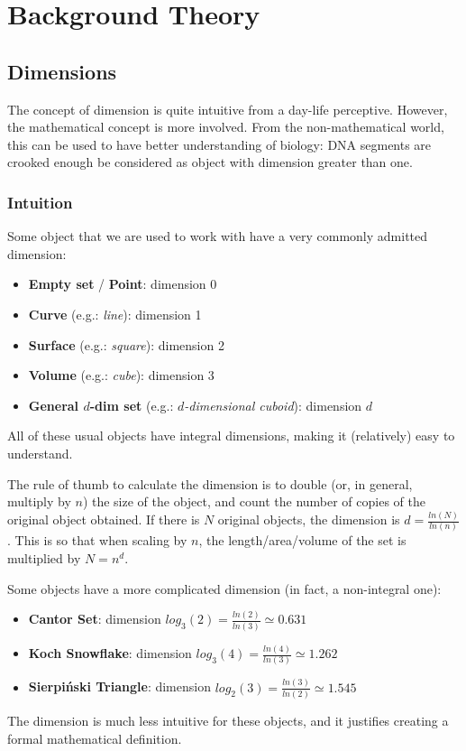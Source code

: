 \section{Background Theory}


\subsection{Dimensions}
The concept of dimension is quite intuitive from a day-life perceptive.
However, the mathematical concept is more involved.
From the non-mathematical world, this can be used to have better understanding of biology: DNA segments are crooked enough be considered as object with dimension greater than one.

\subsubsection{Intuition}
Some object that we are used to work with have a very commonly admitted dimension:
\begin{itemize}
	\item \textbf{Empty set} / \textbf{Point}: dimension 0
	\item \textbf{Curve} (e.g.: \textit{line}): dimension 1
	\item \textbf{Surface} (e.g.: \textit{square}): dimension 2
	\item \textbf{Volume} (e.g.: \textit{cube}): dimension 3
	\item \textbf{General $d$-dim set} (e.g.: \textit{$d$-dimensional cuboid}): dimension $d$
\end{itemize}
All of these usual objects have integral dimensions, making it (relatively) easy to understand.

The rule of thumb to calculate the dimension is to double (or, in general, multiply by $n$) the size of the object, and count the number of copies of the original object obtained.
If there is $N$ original objects, the dimension is $d = \frac{ln(N)}{ln(n)}$.
This is so that when scaling by $n$, the length/area/volume of the set is multiplied by $N = n^d$.

Some objects have a more complicated dimension (in fact, a non-integral one):
\begin{itemize}
	\item \textbf{Cantor Set}: dimension $log_3(2) = \frac{ln(2)}{ln(3)} \simeq 0.631$
	\item \textbf{Koch Snowflake}: dimension $log_3(4) = \frac{ln(4)}{ln(3)} \simeq 1.262$
	\item \textbf{Sierpiński Triangle}: dimension $log_2(3) = \frac{ln(3)}{ln(2)} \simeq 1.545$
\end{itemize}
The dimension is much less intuitive for these objects, and it justifies creating a formal mathematical definition.

